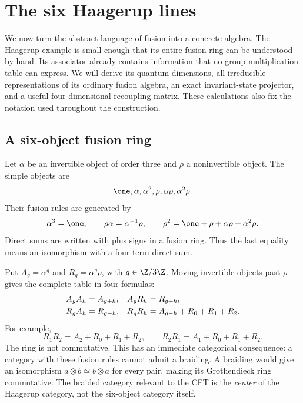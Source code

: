 \chapter{The six Haagerup lines}
\label{ch:haagerup}

We now turn the abstract language of fusion into a concrete algebra.
The Haagerup example is small enough that its entire fusion ring can
be understood by hand.  Its associator already contains information
that no group multiplication table can express.  We will derive its
quantum dimensions, all irreducible representations of its ordinary
fusion algebra, an exact invariant-state projector, and a useful
four-dimensional recoupling matrix.  These calculations also fix the
notation used throughout the construction.

\section{A six-object fusion ring}

Let $\alpha$ be an invertible object of order three and $\rho$ a
noninvertible object.  The simple objects are
\[
 \one,\alpha,\alpha^2,\rho,\alpha\rho,\alpha^2\rho.
\]
Their fusion rules are generated by
\begin{equation}
 \alpha^3=\one,\qquad
 \rho\alpha=\alpha^{-1}\rho,\qquad
 \rho^2=\one+\rho+\alpha\rho+\alpha^2\rho.
 \label{eq:H3-generating-ring}
\end{equation}
Direct sums are written with plus signs in a fusion ring.  Thus the
last equality means an isomorphism with a four-term direct sum.

Put $A_g=\alpha^g$ and $R_g=\alpha^g\rho$, with
$g\in\Z/3\Z$.  Moving invertible objects past $\rho$ gives the
complete table in four formulas:
\begin{align}
 A_g A_h&=A_{g+h},& A_gR_h&=R_{g+h},\notag\\
 R_gA_h&=R_{g-h},&
 R_gR_h&=A_{g-h}+R_0+R_1+R_2.
 \label{eq:H3-all-products}
\end{align}
For example,
\[
 R_1R_2=A_2+R_0+R_1+R_2,
 \qquad R_2R_1=A_1+R_0+R_1+R_2.
\]
The ring is not commutative.  This has an immediate categorical
consequence: a category with these fusion rules cannot admit a
braiding.  A braiding would give an isomorphism $a\otimes b\simeq
b\otimes a$ for every pair, making its Grothendieck ring commutative.
The braided category relevant to the CFT is the \emph{center} of the
Haagerup category, not the six-object category itself.

